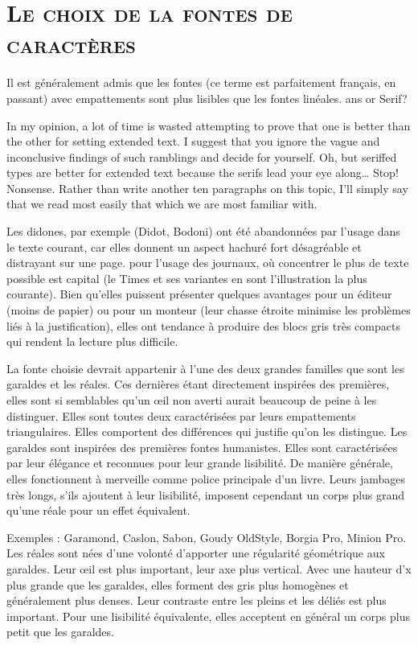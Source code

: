 \documentclass[12pt,a4paper,twocolumn]{book} %
\begin{document}
\section{\textsc{Le choix de la fontes de caractères}}
Il est généralement admis que les fontes (ce terme est parfaitement français, en passant) avec empattements sont plus lisibles que les fontes linéales.
ans or Serif?

In my opinion, a lot of time is wasted attempting to prove that one is better than the other for setting extended text. I suggest that you ignore the vague and inconclusive findings of such ramblings and decide for yourself. Oh, but seriffed types are better for extended text because the serifs lead your eye along… Stop! Nonsense.
Rather than write another ten paragraphs on this topic, I’ll simply say that we read most easily that which we are most familiar with.


Les didones, par exemple (Didot, Bodoni) ont été abandonnées par l’usage dans le texte courant, car elles donnent un aspect hachuré fort désagréable et distrayant sur une page.
pour l’usage des journaux, où concentrer le plus de texte possible est capital (le Times et ses variantes en sont l’illustration la plus courante). Bien qu’elles puissent présenter quelques avantages pour un éditeur (moins de papier) ou pour un monteur (leur chasse étroite minimise les problèmes liés à la justification), elles ont tendance à produire des blocs gris très compacts qui rendent la lecture plus difficile.

La fonte choisie devrait appartenir à l’une des deux grandes familles que sont les garaldes et les réales. Ces dernières étant directement inspirées des premières, elles sont si semblables qu’un œil non averti aurait beaucoup de peine à les distinguer. Elles sont toutes deux caractérisées par leurs empattements triangulaires. Elles comportent des différences qui justifie qu’on les distingue.
Les garaldes sont inspirées des premières fontes humanistes. Elles sont caractérisées par leur élégance et reconnues pour leur grande lisibilité. De manière générale, elles fonctionnent à merveille comme police principale d’un livre. Leurs jambages très longs, s’ils ajoutent à leur lisibilité, imposent cependant un corps plus grand qu’une réale pour un effet équivalent.

Exemples : Garamond, Caslon, Sabon, Goudy OldStyle, Borgia Pro, Minion Pro.
Les réales sont nées d’une volonté d’apporter une régularité géométrique aux garaldes. Leur œil est plus important, leur axe plus vertical. Avec une hauteur d’x plus grande que les garaldes, elles forment des gris plus homogènes et généralement plus denses. Leur contraste entre les pleins et les déliés est plus important. Pour une lisibilité équivalente, elles acceptent en général un corps plus petit que les garaldes.
\end{document}
